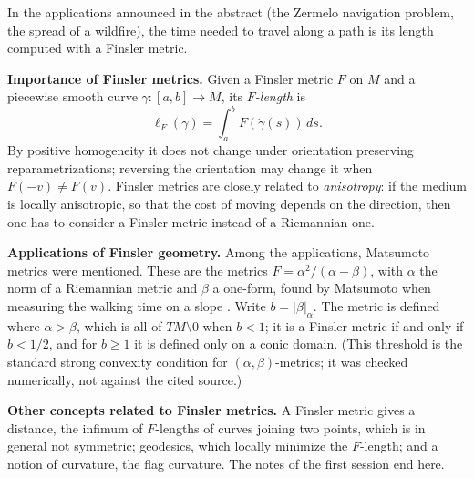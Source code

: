 \begin{remark}
\label{remark-javaloyes-time-length}
In the applications announced in the
abstract (the Zermelo navigation problem,
the spread of a wildfire), the time needed
to travel along a path is its length
computed with a Finsler metric.
\end{remark}

\medskip\noindent
{\bf Importance of Finsler metrics.}
Given a Finsler metric $F$ on $M$ and a
piecewise smooth curve
$\gamma : [a,b] \to M$, its
\emph{$F$-length} is
$$
\ell_F(\gamma) =
\int_a^b F(\dot\gamma(s))\, ds.
$$
By positive homogeneity it does not change
under orientation preserving
reparametrizations; reversing the
orientation may change it when
$F(-v) \neq F(v)$. Finsler metrics are
closely related to \emph{anisotropy}: if
the medium is locally anisotropic, so that
the cost of moving depends on the
direction, then one has to consider a
Finsler metric instead of a Riemannian one.

\medskip\noindent
{\bf Applications of Finsler geometry.}
Among the applications, Matsumoto metrics
were mentioned. These are the metrics
$F = \alpha^2/(\alpha - \beta)$, with
$\alpha$ the norm of a Riemannian metric
and $\beta$ a one-form, found by Matsumoto
when measuring the walking time on a slope
\cite[Section 4.2.3]%
{javaloyes2014definition}. Write
$b=|\beta|_\alpha$. The metric is defined
where $\alpha>\beta$, which is all of
$TM\setminus 0$ when $b<1$; it is a Finsler
metric if and only if $b<1/2$, and for
$b\geq 1$ it is defined only on a conic
domain. (This threshold is the standard
strong convexity condition for
$(\alpha,\beta)$-metrics; it was checked
numerically, not against the cited
source.)

\medskip\noindent
{\bf Other concepts related to Finsler
metrics.}
A Finsler metric gives a distance, the
infimum of $F$-lengths of curves joining
two points, which is in general not
symmetric; geodesics, which locally
minimize the $F$-length; and a notion of
curvature, the flag curvature. The notes
of the first session end here.





